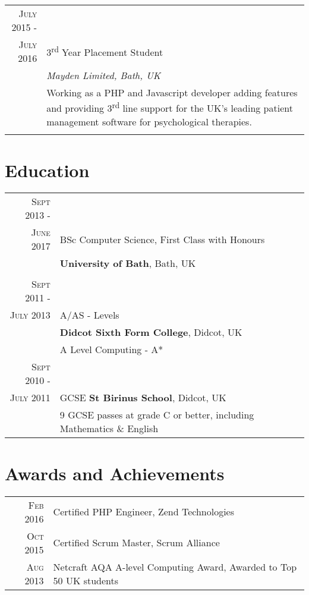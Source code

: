 \documentclass[a4paper,12pt]{article}
\begin{document}
{\begin{tabular}{rp{11cm}}
\textsc{July} 2015 -\\ \textsc{July} 2016 & 3\textsuperscript{rd} Year Placement Student \\&\emph{Mayden Limited, Bath, UK}\\&\footnotesize{Working as a PHP and Javascript developer adding features and providing 3\textsuperscript{rd} line support for the UK's leading patient management software for psychological therapies.}\\\multicolumn{2}{c}{} \\
\end{tabular}

\vspace{1cm}
\section{Education}
\begin{tabular}{rl}
 \textsc{Sept} 2013 -\\ \textsc{June} 2017 & BSc Computer Science, First Class with Honours  \\
 & \textbf{University of Bath}, Bath, UK\\

& \\
\textsc{Sept} 2011 -\\ \textsc{July} 2013 & A/AS - Levels \\& \normalsize\textbf{Didcot Sixth Form College}, Didcot, UK\\
& A Level Computing - A*\\
\textsc{Sept} 2010 -\\ \textsc{July} 2011& GCSE \textbf{St Birinus School}, Didcot, UK\\
&9 GCSE passes at grade C or better, including Mathematics \& English \\
\end{tabular}

\vspace{1cm}

\section{Awards and Achievements}
\begin{tabular}{rl}
 \textsc{Feb} 2016 & Certified PHP Engineer, Zend Technologies\\
 \textsc{Oct} 2015 & Certified Scrum Master, Scrum Alliance\\
 \textsc{Aug} 2013 & Netcraft AQA A-level Computing Award, Awarded to Top 50 UK students\\
\end{tabular}

}
\end{document}
